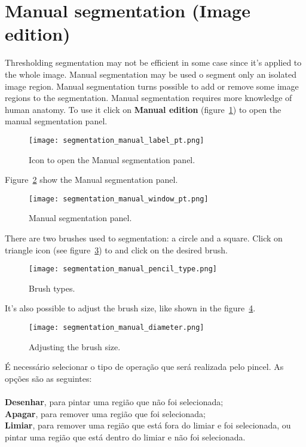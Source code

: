 \section{Manual segmentation (Image edition)}

Thresholding segmentation may not be efficient in some case since it's applied to the whole image. Manual segmentation may be used o segment only an isolated image region. Manual segmentation turns possible to add or remove some image regions to the segmentation. Manual segmentation requires more knowledge of  human anatomy. To use it click on \textbf{Manual edition} (figure~\ref{fig:advanced_edition}) to open the manual segmentation panel.

\begin{figure}[!htb]
\centering
\texttt{[image: segmentation\_manual\_label\_pt.png]}
\caption{Icon to open the Manual segmentation panel.}
\label{fig:advanced_edition}
\end{figure}

Figure~\ref{fig:edition_slices_ref} show the Manual segmentation panel.

\begin{figure}[!htb]
\centering
\texttt{[image: segmentation\_manual\_window\_pt.png]}
\caption{Manual segmentation panel.}
\label{fig:edition_slices_ref}
\end{figure}

There are two brushes used to segmentation: a circle and a square. Click on triangle icon (see figure~\ref{fig:brush_type}) to and click on the desired brush.

\begin{figure}[!htb]
\centering
\texttt{[image: segmentation\_manual\_pencil\_type.png]}
\caption{Brush types.}
\label{fig:brush_type}
\end{figure}

\newpage

It's also possible to adjust the brush size, like shown in the figure~\ref{fig:select_diameter}.

\begin{figure}[!htb]
\centering
\texttt{[image: segmentation\_manual\_diameter.png]}
\caption{Adjusting the brush size.}
\label{fig:select_diameter}
\end{figure}

É necessário selecionar o tipo de operação que será realizada pelo pincel. As opções são as
seguintes:\\
\\
\textbf{Desenhar}, para pintar uma região que não foi selecionada;\\
\textbf{Apagar}, para remover uma região que foi selecionada;\\
\textbf{Limiar}, para remover uma região que está fora do limiar e foi selecionada, ou pintar
uma região que está dentro do limiar e não foi selecionada.\\

